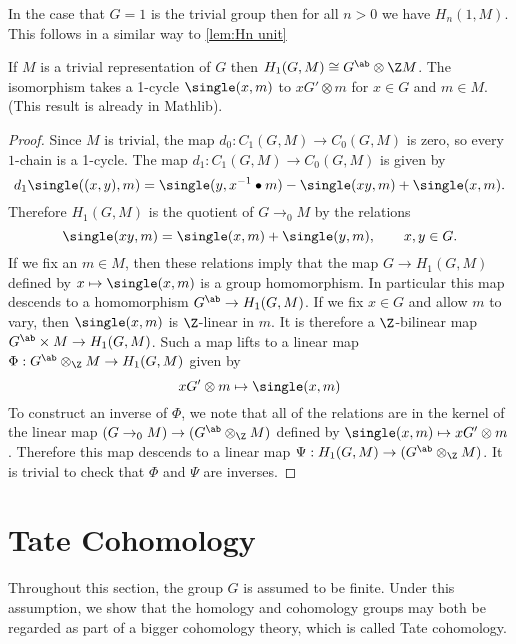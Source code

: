 \begin{example} \label{eg:homology unit}
	In the case that $G=1$ is the trivial group then for all $n > 0$ we have
	$H_n(1,M)$.
	This follows in a similar way to \ref{lem:Hn unit}
\end{example}

\begin{lemma} \label{lem:homology 1 trivial}
	\mathlibok
	\leanok
	If $M$ is a trivial representation of $G$ then $H_1(G,M) \cong G^{\ab} \otimes \Z M$.
	The isomorphism takes a 1-cycle $\single(x,m)$ to $xG' \otimes m$ for $x \in G$ and $m \in M$.
	(This result is already in Mathlib).
\end{lemma}

\begin{proof}
	\mathlibok
	\leanok
	Since $M$ is trivial, the map $d_0 : C_1(G,M) \to C_0(G,M)$ is zero, so every $1$-chain is
	a 1-cycle.
	The map $d_1 : C_1(G,M) \to C_0(G,M)$ is given by
	\[
		d_1 \single((x,y),m)
		= \single(y,x^{-1} \bullet m) - \single(xy,m) + \single(x,m).
	\]
	Therefore $H_1(G,M)$ is the quotient of $G \to_0 M$ by the relations
	\[
		\single(xy,m) = \single(x,m) + \single(y,m),
		\qquad x,y \in G.
	\]
	If we fix an $m \in M$, then these relations imply that the map $G \to H_1(G,M)$ defined by
	$x \mapsto \single(x,m)$ is a group homomorphism.
	In particular this map descends to a homomorphism $G^{\ab} \to H_1(G,M)$.
	If we fix $x \in G$ and allow $m$ to vary, then $\single(x,m)$
	is $\Z$-linear in $m$. It is therefore a $\Z$-bilinear map $G^\ab \times M \to H_1(G,M)$.
	Such a map lifts to a linear map $\Phi : G^{\ab} \otimes_{\Z} M \to H_1(G,M)$	given by
	\[
		xG' \otimes m \mapsto \single(x,m)
	\]
	To construct an inverse of $\Phi$, we note that all of the relations are in the kernel of the
	linear map $(G\to_0 M) \to (G^\ab \otimes_\Z M)$ defined by $\single(x,m) \mapsto xG' \otimes m$.
	Therefore this map descends to a linear map $\Psi : H_1(G,M) \to (G^\ab \otimes_\Z M)$.
	It is trivial to check that $\Phi$ and $\Psi$ are inverses.
\end{proof}



\section{Tate Cohomology}

Throughout this section, the group $G$ is assumed to be finite.
Under this assumption, we show that the homology and cohomology groups
may both be regarded as part of a bigger cohomology theory, which is called Tate cohomology.

